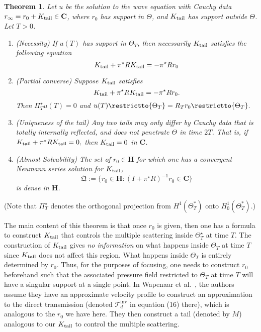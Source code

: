 \documentclass[10pt]{article}
\theoremstyle{plain}
\newtheorem{theorem}{Theorem}
\theoremstyle{definition}
\theoremstyle{remark}
\numberwithin{theorem}{section}
\numberwithin{example}{section}
\numberwithin{equation}{section}
\numberwithin{figure}{section}
\def\beq{\begin{equation} }
\def\eeq{\end{equation}}
\newcommand\tail{_{\textup{tail}}}
\begin{document}
\begin{theorem} \label{thm: focusing}
 Let $u$ be the solution to the wave equation with Cauchy data $r_{\infty} = r_0 + K\tail \in \mathbf{C}$, where $r_0$ has support in $\Theta$, and $K\tail$ has support outside $\Theta$. Let $T>0$.
\begin{enumerate}
\item[(i)](Necessity)
If $u(T)$ has support in $\Theta_T$, then necessarily $K\tail$ satisfies the following equation
\beq{ \label{eq: generalized Rose equation}
K\tail + \pi^\star RK\tail = -\pi^\star Rr_0
}\eeq

\item[(ii)](Partial converse) Suppose $K\tail$ satisfies
$$ K\tail + \pi^\star RK\tail = -\pi^\star Rr_0.$$
Then $\Pi^\star_T u(T) = 0$ and $u(T)\restrictto{\Theta_T} = R_Tr_0 \restrictto{\Theta_T}.$

\item[(iii)](Uniqueness of the tail) Any two tails may only differ by Cauchy data that is totally internally reflected, and does not penetrate $\Theta$ in time $2T$. That is, if
    $K\tail + \pi^\star RK\tail = 0,$
    then $K\tail =0$ in $\mathbf{C}$.
\item[(iv)](Almost Solvability) The set of $r_0 \in \mathbf H$ for which one has a convergent Neumann series solution for $K\tail$,
    $$ \mathfrak{Q} := \{ r_0 \in \mathbf H : (I+\pi^\star R)^{-1}r_0 \in \mathbf C \}$$
    is dense in $\mathbf H$.
\end{enumerate}
\end{theorem}
(Note that $\Pi_T^\star$ denotes the orthogonal projection from $H^1(\Theta_T^*)$ onto $H_0^1(\Theta_T^*)$.)

\begin{rem}\label{rem: control of multiple scattering}
The main content of this theorem is that once $r_0$ is given, then one has a formula to construct $K\tail$ that controls the multiple scattering inside $\Theta^\star_T$ at time $T$. The construction of $K\tail$ gives \emph{no information} on what happens inside $\Theta_T$ at time $T$ since $K\tail$ does not affect this region. What happens inside $\Theta_T$ is entirely determined by $r_0$. Thus, for the purposes of focusing, one needs to construct $r_0$ beforehand such that the associated pressure field restricted to $\Theta_T$ at time $T$ will have a singular support at a single point. In Wapenaar et al.~\cite{Wap}, the authors assume they have an approximate velocity profile to construct an approximation to the direct transmission (denoted $\mathcal{T}^{\text{inv}}_d$ in equation (16) there), which is analogous to the $r_0$ we have here. They then construct a tail (denoted by $M$) analogous to our $K\tail$ to control the multiple scattering.
\end{rem}
\end{document}
